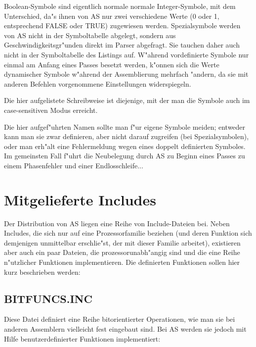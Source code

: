 \documentclass[12pt,a4paper,twoside]{report}
\newcommand{\asname}{AS}
\begin{document}
Boolean-Symbole sind eigentlich normale normale Integer-Symbole, mit
dem Unterschied, da"s ihnen von \asname{} nur zwei verschiedene Werte (0 oder
1, entsprechend FALSE oder TRUE) zugewiesen werden.  Spezialsymbole
werden von \asname{} nicht in der Symboltabelle abgelegt, sondern aus
Geschwindigkeitsgr"unden direkt im Parser abgefragt.  Sie tauchen daher
auch nicht in der Symboltabelle des Listings auf.  W"ahrend vordefinierte
Symbole nur einmal am Anfang eines Passes besetzt werden, k"onnen sich
die Werte dynamischer Symbole w"ahrend der Assemblierung mehrfach "andern,
da sie mit anderen Befehlen vorgenommene Einstellungen widerspiegeln.
\par
Die hier aufgelistete Schreibweise ist diejenige, mit der man die
Symbole auch im case-sensitiven Modus erreicht.
\par
Die hier aufgef"uhrten Namen sollte man f"ur eigene Symbole meiden;
entweder kann man sie zwar definieren, aber nicht darauf zugreifen
(bei Spezialsymbolen), oder man erh"alt eine Fehlermeldung wegen eines
doppelt definierten Symboles.  Im gemeinsten Fall f"uhrt die Neubelegung
durch \asname{} zu Beginn eines Passes zu einem Phasenfehler und einer
Endlosschleife...



\cleardoublepage
\chapter{Mitgelieferte Includes}

Der Distribution von \asname{} liegen eine Reihe von Include-Dateien bei.  Neben
Includes, die sich nur auf eine Prozessorfamilie beziehen (und deren
Funktion sich demjenigen unmittelbar erschlie"st, der mit dieser Familie
arbeitet), existieren aber auch ein paar Dateien, die prozessorunabh"angig
sind und die eine Reihe n"utzlicher Funktionen implementieren.  Die
definierten Funktionen sollen hier kurz beschrieben werden:

\section{BITFUNCS.INC}

Diese Datei definiert eine Reihe bitorientierter Operationen, wie man sie
bei anderen Assemblern vielleicht fest eingebaut sind.  Bei \asname{} werden sie
jedoch mit Hilfe benutzerdefinierter Funktionen implementiert:
\end{document}
